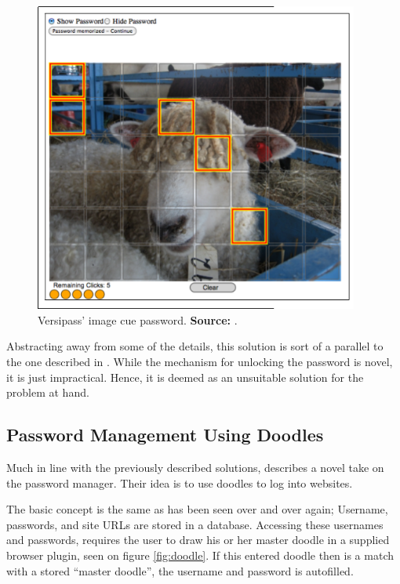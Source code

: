 			\begin{figure}[htbp]
				\centering
				\includegraphics[width=0.95\textwidth]{figures/analysis/versipass_imagecue.png}
				\caption{Versipass' image cue password. \textbf{Source:} \cite[p.3]{stobert2014}.}
				\label{fig:versipass_imagecue}
			\end{figure}

			Abstracting away from some of the details, this solution is sort of a parallel to the one described in \cite{busch2014}. While the mechanism for unlocking the password is novel, it is just impractical. Hence, it is deemed as an unsuitable solution for the problem at hand.

		\subsection*{Password Management Using Doodles}
			Much in line with the previously described solutions, \cite{doodles} describes a novel take on the password manager. Their idea is to use doodles to log into websites.

			The basic concept is the same as has been seen over and over again; Username, passwords, and site URLs are stored in a database. Accessing these usernames and passwords, requires the user to draw his or her master doodle in a supplied browser plugin, seen on figure \ref{fig:doodle}. If this entered doodle then is a match with a stored ``master doodle'', the username and password is autofilled.

